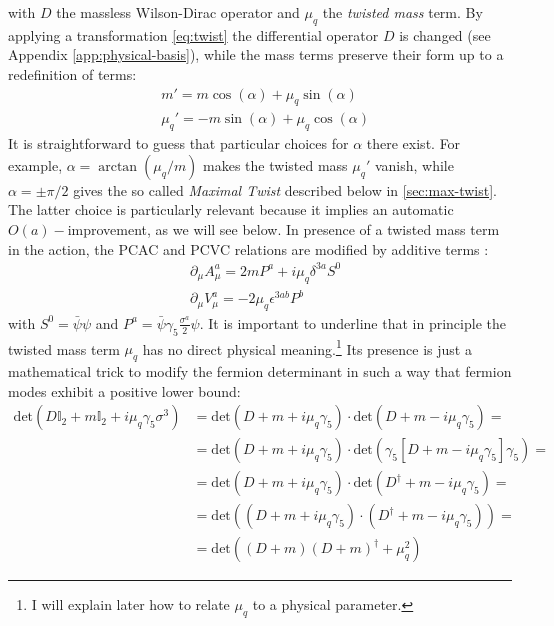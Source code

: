 \documentclass[english, LaM, oneside, noexaminfo]{sapthesis}
\newcommand{\oait}{$O(a)-$improvement}
\begin{document}
with $D$ the massless Wilson-Dirac operator and $\mu_q$ the {\it twisted mass} term.
By applying a transformation \ref{eq:twist} the differential operator $D$ is changed (see Appendix \ref{app:physical-basis}), while the mass terms preserve their form up to a redefinition of terms:
\begin{equation}\label{eq:new-masses}
    \begin{aligned}
        & m' = m \cos (\alpha) + \mu_q \sin (\alpha) \\
        & \mu_q' = - m \sin (\alpha) + \mu_q \cos (\alpha)
    \end{aligned}
\end{equation}
It is straightforward to guess that particular choices for $\alpha$ there exist. 
For example, $\alpha = \arctan (\mu_q/m)$ makes the twisted mass $\mu_q'$ vanish, while $\alpha = \pm \pi/2$ gives the so called {\it Maximal Twist} described below in \ref{sec:max-twist}. 
The latter choice is particularly relevant because it implies an automatic \oait, as we will see below.
In presence of a twisted mass term in the action, the PCAC and PCVC relations are modified by additive terms \cite{tmLQCD}:
\begin{equation*}
    \begin{aligned}
        & \partial_\mu A_\mu^a = 2mP^a + i \mu_q \delta^{3a} S^0 \\
        & \partial_\mu V_\mu^a = - 2\mu_q \epsilon^{3ab}P^b
    \end{aligned}
\end{equation*}
with $S^0 = \bar \psi \psi$ and $P^a = \bar \psi \gamma_5 \frac{\sigma^a}{2} \psi$.
\newline
It is important to underline that in principle the twisted mass term $\mu_q$ has no direct physical meaning.\footnote{I will explain later how to relate $\mu_q$ to a physical parameter.}
Its presence is just a mathematical trick to modify the fermion determinant in such a way that fermion modes exhibit a positive lower bound:
\begin{equation*}
    \begin{aligned}
        \text{det}(D \mathbb{I}_2 + m \mathbb{I}_2 + i\mu_q\gamma_5\sigma^3) 
        & = \text{det}(D + m + i\mu_q\gamma_5) \cdot \text{det}(D + m - i\mu_q\gamma_5) = \\
        & = \text{det}(D + m + i\mu_q\gamma_5) \cdot \text{det}(\gamma_5[D + m - i\mu_q\gamma_5]\gamma_5) = \\
        & = \text{det}(D + m + i\mu_q\gamma_5) \cdot \text{det}(D^\dagger + m - i\mu_q\gamma_5) = \\
        & = \text{det}\left((D + m + i\mu_q\gamma_5)\cdot(D^\dagger + m - i\mu_q\gamma_5)\right) = \\
        & = \text{det}\left((D+m)(D+m)^\dagger + \mu_q^2\right)
    \end{aligned}
\end{equation*}
\end{document}
